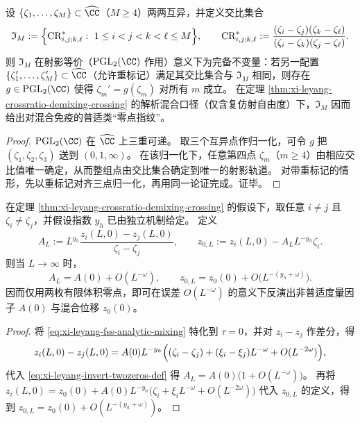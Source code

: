 \begin{proposition}\label{prop:xi-leyang-crossratio-projective-fingerprint-complete}
设 \(\{\zeta_1,\dots,\zeta_M\}\subset\widehat{\CC}\)（\(M\ge 4\)）两两互异，并定义交比集合
\[
\mathfrak{I}_M:=\Bigl\{\mathrm{CR}^{\ast}_{i,j;k,\ell}:\ 1\le i<j<k<\ell\le M\Bigr\},
\qquad
\mathrm{CR}^{\ast}_{i,j;k,\ell}
:=
\frac{(\zeta_i-\zeta_j)(\zeta_k-\zeta_\ell)}{(\zeta_i-\zeta_k)(\zeta_j-\zeta_\ell)}.
\]
则 \(\mathfrak{I}_M\) 在射影等价（\(\mathrm{PGL}_2(\CC)\) 作用）意义下为完备不变量：若另一配置 \(\{\zeta_1',\dots,\zeta_M'\}\subset\widehat{\CC}\)（允许重标记）满足其交比集合与 \(\mathfrak{I}_M\) 相同，则存在 \(g\in\mathrm{PGL}_2(\CC)\) 使得 \(\zeta_m'=g(\zeta_m)\) 对所有 \(m\) 成立。
在定理 \ref{thm:xi-leyang-crossratio-demixing-crossing} 的解析混合口径（仅含复仿射自由度）下，\(\mathfrak{I}_M\) 因而给出对混合免疫的普适类“零点指纹”。
\end{proposition}
\begin{proof}
\(\mathrm{PGL}_2(\CC)\) 在 \(\widehat{\CC}\) 上三重可递。
取三个互异点作归一化，可令 \(g\) 把 \((\zeta_1,\zeta_2,\zeta_3)\) 送到 \((0,1,\infty)\)。
在该归一化下，任意第四点 \(\zeta_m\)（\(m\ge 4\)）由相应交比值唯一确定，从而整组点由交比集合确定到唯一的射影轨道。
对带重标记的情形，先以重标记对齐三点归一化，再用同一论证完成。证毕。
\end{proof}

\begin{theorem}[由两枚有限体积零点反演度量因子与混合位移]\label{thm:xi-leyang-invert-metric-and-shift-from-two-zeros}
在定理 \ref{thm:xi-leyang-crossratio-demixing-crossing} 的假设下，取任意 \(i\neq j\) 且 \(\zeta_i\neq\zeta_j\)，并假设指数 \(y_h\) 已由独立机制给定。
定义
\begin{equation}\label{eq:xi-leyang-invert-twozeros-def}
A_L:=L^{y_h}\frac{z_i(L,0)-z_j(L,0)}{\zeta_i-\zeta_j},
\qquad
z_{0,L}:=z_i(L,0)-A_L L^{-y_h}\zeta_i.
\end{equation}
则当 \(L\to\infty\) 时，
\begin{equation}\label{eq:xi-leyang-invert-twozeros-asymp}
A_L=A(0)+O(L^{-\omega}),\qquad
z_{0,L}=z_0(0)+O\!\bigl(L^{-(y_h+\omega)}\bigr).
\end{equation}
因而仅用两枚有限体积零点，即可在误差 \(O(L^{-\omega})\) 的意义下反演出非普适度量因子 \(A(0)\) 与混合位移 \(z_0(0)\)。
\end{theorem}
\begin{proof}
将 \eqref{eq:xi-leyang-fss-analytic-mixing} 特化到 \(\tau=0\)，并对 \(z_i-z_j\) 作差分，得
\[
z_i(L,0)-z_j(L,0)
=
A(0)L^{-y_h}\Bigl((\zeta_i-\zeta_j)+(\xi_i-\xi_j)L^{-\omega}+O(L^{-2\omega})\Bigr),
\]
代入 \eqref{eq:xi-leyang-invert-twozeros-def} 得 \(A_L=A(0)\bigl(1+O(L^{-\omega})\bigr)\)。
再将 \(z_i(L,0)=z_0(0)+A(0)L^{-y_h}\bigl(\zeta_i+\xi_iL^{-\omega}+O(L^{-2\omega})\bigr)\) 代入 \(z_{0,L}\) 的定义，得到
\(
z_{0,L}=z_0(0)+O(L^{-(y_h+\omega)})
\)。
\end{proof}

